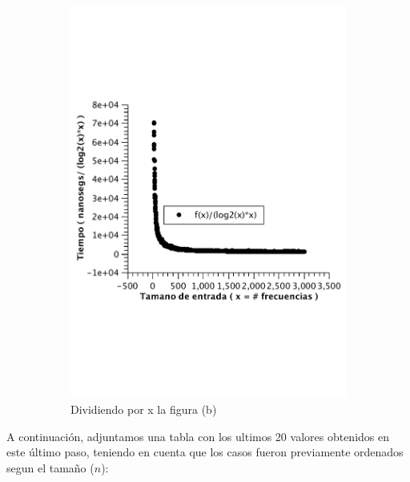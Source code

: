 \begin{figure}[H]
        \begin{subfigure}[b]{0.5\textwidth}
                \includegraphics[width=\textwidth]{imagenes/af-rand-const.pdf}
                \caption{Dividiendo por x la figura (b)}
        \end{subfigure}
        \caption{}
\end{figure}



A continuación, adjuntamos una tabla con los ultimos 20 valores obtenidos en este último paso, teniendo en cuenta que los casos fueron previamente ordenados segun el tamaño ($n$):

